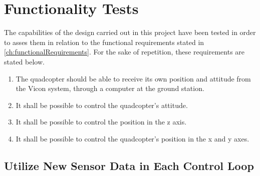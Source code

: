\chapter{Functionality Tests}
The capabilities of the design carried out in this project have been tested in order to asses them in relation to the functional requirements stated in \autoref{ch:functionalRequirements}. 
For the sake of repetition, these requirements are stated below.
\begin{enumerate}[label=\textbf{\arabic*})]
\item {The quadcopter should be able to receive its own position and attitude from the Vicon system, through a computer at the ground station.}
\item {It shall be possible to control the quadcopter's attitude.}
\item {It shall be possible to control the position in the z axis.}
\item {It shall be possible to control the quadcopter's position in the x and y axes.}
\end{enumerate}

\section{Utilize New Sensor Data in Each Control Loop}


